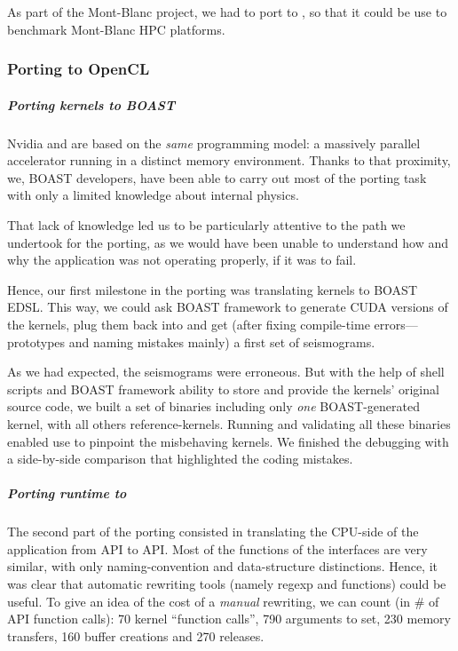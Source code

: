 As part of the Mont-Blanc project, we had to port \Specfem to \OCL, so
that it could be use to benchmark Mont-Blanc HPC platforms.

\subsubsection{Porting to OpenCL}

\subparagraph{Porting kernels to BOAST} Nvidia \Cuda and \OCL are
based on the \emph{same} programming model: a massively parallel
accelerator running in a distinct memory environment. Thanks to that
proximity, we, BOAST developers, have been able to carry out most of
the porting task with only a limited knowledge about \Specfem internal
physics.

That lack of knowledge led us to be particularly attentive to the path
we undertook for the porting, as we would have been unable to
understand how and why the application was not operating properly, if
it was to fail.

Hence, our first milestone in the porting was translating \Specfem
\Cuda kernels to BOAST EDSL. This way, we could ask BOAST framework to
generate CUDA versions of the kernels, plug them back into \Specfem and
get (after fixing compile-time errors---prototypes and naming mistakes
mainly) a first set of \Specfem seismograms.

As we had expected, the seismograms were erroneous. But with the help
of shell scripts and BOAST framework ability to store and provide the
kernels' original source code, we built a set of \Specfem binaries
including only \emph{one} BOAST-generated kernel, with all others
reference-kernels. Running and validating all these binaries enabled
use to pinpoint the misbehaving kernels. We finished the debugging
with a side-by-side comparison that highlighted the coding mistakes.

\subparagraph{Porting runtime to \OCL} The second part of the porting
consisted in translating the CPU-side of the application from \Cuda
API to \OCL API. Most of the functions of the interfaces are very
similar, with only naming-convention and data-structure
distinctions. Hence, it was clear that automatic rewriting tools
(namely  regexp and  functions) could be
useful. To give an idea of the cost of a \emph{manual} rewriting, we
can count (in \# of \OCL API function calls): 70 kernel ``function
calls'', 790 arguments to set, 230 memory transfers, 160 buffer
creations and 270 releases.

